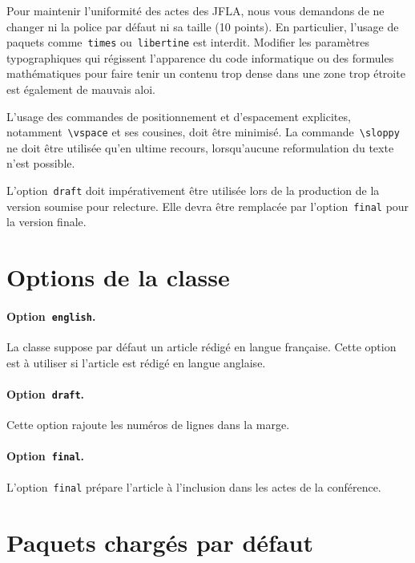 \documentclass[draft]{jflart}
\newcommand{\cmd}[1]{\texttt{\textbackslash {#1}}}
\begin{document}
Pour maintenir l'uniformité des actes des JFLA, nous vous demandons de ne
changer ni la police par défaut ni sa taille (10 points).
%
En particulier, l'usage de paquets comme~\texttt{times} ou~\texttt{libertine}
est interdit.
%
Modifier les paramètres typographiques qui régissent l'apparence du code
informatique ou des formules mathématiques pour faire tenir un contenu trop
dense dans une zone trop étroite est également de mauvais aloi.

L'usage des commandes de positionnement et d'espacement explicites,
notamment~\cmd{vspace} et ses cousines, doit être minimisé.
%
La commande~\cmd{sloppy} ne doit être utilisée qu'en ultime recours,
lorsqu'aucune reformulation du texte n'est possible.

L'option~\texttt{draft} doit impérativement être utilisée lors de la production
de la version soumise pour relecture.
%
Elle devra être remplacée par l'option~\texttt{final} pour la version finale.

\section{Options de la classe}

\paragraph{Option~\texttt{english}.}

La classe suppose par défaut un article rédigé en langue française.
%
Cette option est à utiliser si l'article est rédigé en langue anglaise.

\paragraph{Option~\texttt{draft}.}

Cette option rajoute les numéros de lignes dans la marge.

\paragraph{Option~\texttt{final}.}

L'option~\texttt{final} prépare l'article à l'inclusion dans les actes de la
conférence.

\section{Paquets chargés par défaut}
\end{document}
